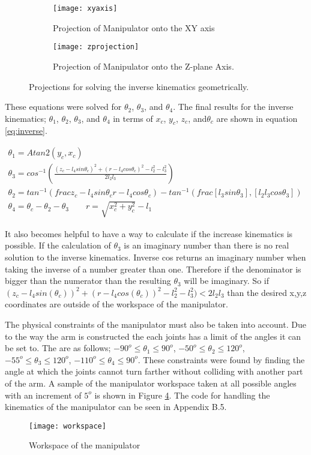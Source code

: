 \begin{figure}
    \centering
    \begin{subfigure}[b]{0.3\textwidth}
    	\texttt{[image: xyaxis]}
    	\caption{Projection of Manipulator onto the XY axis}
   	 	\label{fig:xy}
   	 \end{subfigure}
   	 \quad
    \begin{subfigure}[b]{0.3\textwidth}
		\texttt{[image: zprojection]}
		\caption{Projection of Manipulator onto the Z-plane Axis. }
		\label{fig:z}
    \end{subfigure}
    \quad %
 	\caption{Projections for solving the inverse kinematics geometrically.}
\end{figure}
These equations were solved for $\theta_2$, $\theta_3$, and $\theta_4$.  The final results for the inverse kinematics; $\theta_1$, $\theta_2$, $\theta_3$, and $\theta_4$ in terms of $x_c$, $y_c$, $z_c$, and$\theta_c$ are shown in equation \ref{eq:inverse}.

\begin{subequations}
\label{eq:inverse}
	\begin{align}
	\theta_1 = Atan2(y_c,x_c)\qquad \\
	\theta_3 = cos^{-1}(\frac{(z_c-l_4sin\theta_c)^2+(r-l_4cos\theta_c)^2-l_2^2-l_3^2}{2l_2l_3})\qquad \\
	\theta_2 = tan^{-1}(frac{z_c-l_4sin\theta_c}{r-l_4cos\theta_c}) - tan^{-1}(frac{[l_3sin\theta_3],[l_2l_3cos\theta_3]}) \qquad \\
	\theta_4 = \theta_c - \theta_2 - \theta_3 \qquad
	r = \sqrt{x_c^2+y_c^2}-l_1
	\end{align}
\end{subequations}


It also becomes helpful to have a way to calculate if the increase kinematics is possible. If the calculation of $\theta_3$ is an imaginary number than there is no real solution to the inverse kinematics. Inverse cos returns an imaginary number when taking the inverse of a number greater than one. Therefore if the denominator is bigger than the numerator than the resulting $\theta_3$ will be imaginary. So if $(z_c-l_4sin(\theta_c))^2 + (r-l_4cos(\theta_c))^2 - l_2^2 - l_3^2) < 2l_2l_3$ than the desired x,y,z coordinates are outside of the workspace of the manipulator. 

The physical constraints of the manipulator must also be taken into account. Due to the way the arm is constructed the each joints has a limit of the angles it can be set to. The are as follows; $-90^o \leq \theta_1 \leq 90^o$, $-50^o \leq \theta_2 \leq 120^o$, $-55^o \leq \theta_3 \leq 120^o$, $-110^o \leq \theta_4 \leq 90^o$. These constraints were found by finding the angle at which the joints cannot turn farther without colliding with another part of the arm. A sample of the manipulator workspace taken at all possible angles with an increment of $5^o$ is shown in Figure \ref{fig:work}.  The code for handling the kinematics of the manipulator can be seen in Appendix B.5.

\begin{figure}
\centering
\texttt{[image: workspace]}
\caption{Workspace of the manipulator }
\label{fig:work}
\end{figure}